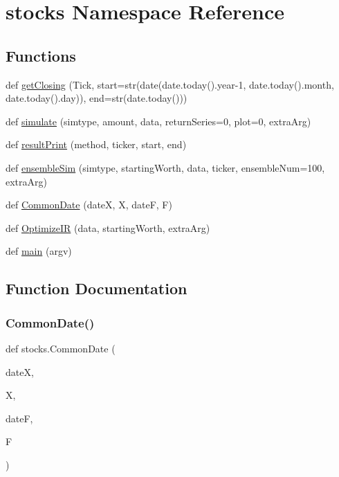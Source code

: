 \hypertarget{namespacestocks}{}\section{stocks Namespace Reference}
\label{namespacestocks}
\subsection*{Functions}
\begin{DoxyCompactItemize}
\item 
def \hyperlink{namespacestocks_a44235135cad9d919663b15452cf3e613}{get\+Closing} (Tick, start=str(date(date.\+today().year-\/1, date.\+today().month, date.\+today().day)), end=str(date.\+today()))
\item 
def \hyperlink{namespacestocks_a6217dcad564ba6361c3cca44542ba220}{simulate} (simtype, amount, data, return\+Series=0, plot=0, extra\+Arg)
\item 
def \hyperlink{namespacestocks_ac80b7d5d1cdc027b7a0e2e19093baf9b}{result\+Print} (method, ticker, start, end)
\item 
def \hyperlink{namespacestocks_a7d4f88b285b7a553f17f91e71ee18a31}{ensemble\+Sim} (simtype, starting\+Worth, data, ticker, ensemble\+Num=100, extra\+Arg)
\item 
def \hyperlink{namespacestocks_a5ce0ea6dd1cb1e1baf78fbb4313b64b9}{Common\+Date} (dateX, X, dateF, F)
\item 
def \hyperlink{namespacestocks_a001673a0b7e5f0867197d97fea8a251b}{Optimize\+IR} (data, starting\+Worth, extra\+Arg)
\item 
def \hyperlink{namespacestocks_aa4d6e539aeea3ab00b8bf598b1025e58}{main} (argv)
\end{DoxyCompactItemize}


\subsection{Function Documentation}
\hypertarget{namespacestocks_a5ce0ea6dd1cb1e1baf78fbb4313b64b9}{}\label{namespacestocks_a5ce0ea6dd1cb1e1baf78fbb4313b64b9} 
\subsubsection{\texorpdfstring{Common\+Date()}{CommonDate()}}
{\footnotesize\ttfamily def stocks.\+Common\+Date (\begin{DoxyParamCaption}\item[{}]{dateX,  }\item[{}]{X,  }\item[{}]{dateF,  }\item[{}]{F }\end{DoxyParamCaption})}



